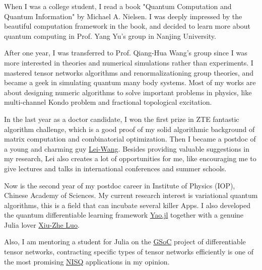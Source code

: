 \documentclass[letterpaper]{article}
\renewenvironment{itemize}{
  \begin{list}{}{
    \setlength{\leftmargin}{1.5em}
  }
}{
  \end{list}
}
\begin{document}
\begin{itemize}
    \item [1] When I was a college student, I read a book "Quantum Computation and Quantum Information" by Michael A. Nielsen.
        I was deeply impressed by the beautiful computation framework in the book, and decided to learn more about quantum computing in Prof. Yang Yu's group in Nanjing University.
    \item [2] After one year, I was transferred to Prof. Qiang-Hua Wang's group since I was more interested in theories and numerical simulations rather than experiments. I mastered tensor networks algorithms and renormalizationing group theories, and became a geek in simulating quantum many body systems. Most of my works are about designing numeric algorithms to solve important problems in physics, like multi-channel Kondo problem and fractional topological excitation.
    \item [3] In the last year as a doctor candidate, I won the first prize in ZTE fantastic algorithm challenge, which is a good proof of my solid algorithmic background of matrix computation and combinatorial optimization. Then I became a postdoc of a young and charming guy \href{http://wangleiphy.github.io/}{Lei-Wang}. Besides providing valuable suggestions in my research, Lei also creates a lot of opportunities for me, like encouraging me to give lectures and talks in international conferences and summer schools.
    \item [4] Now is the second year of my postdoc career in Institute of Physics (IOP), Chinese Academy of Sciences. My current research interest is variational quantum algorithms, this is a field that can incubate several killer Apps. I also developed the quantum differentiable learning framework \href{https://github.com/QuantumBFS/Yao.jl}{Yao.jl} together with a genuine Julia lover \href{http://blog.rogerluo.me/}{Xiu-Zhe Luo}.
    \item [5] Also, I am mentoring a student for Julia on the \href{https://summerofcode.withgoogle.com/}{GSoC} project of differentiable tensor networks,
        contracting specific types of tensor networks efficiently is one of the most promising \href{https://arxiv.org/abs/1801.00862}{NISQ} applications in my opinion.
\end{itemize}
\end{document}
